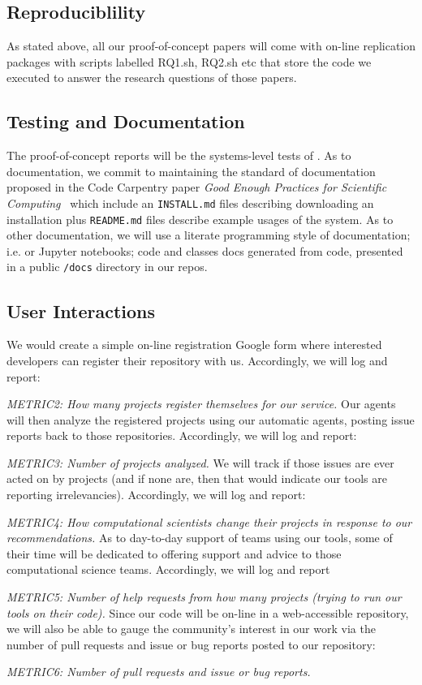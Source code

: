 \subsection{Reproduciblility }
 As stated above,
all our proof-of-concept papers will come with on-line replication packages
with scripts labelled RQ1.sh, RQ2.sh etc that store the code we executed to answer the research questions
of those papers. 


\subsection{Testing and Documentation}
The proof-of-concept reports will be the
systems-level tests of {\IT}.
As to documentation, we   commit to  maintaining  the standard of documentation proposed
in the Code Carpentry  paper {\em Good Enough Practices for Scientific Computing}~\cite{Wilson16} which include an {\tt INSTALL.md} files describing downloading
an installation plus {\tt README.md} files describe example usages of the system.
As to other documentation, we will use a literate  programming style of documentation; i.e.
or Jupyter notebooks;  
 code and classes docs generated  from  code,
presented in a public  {\tt /docs} directory in
our repos.



\subsection{User Interactions} We would create a simple on-line registration Google
form  where interested developers can register their repository with us. Accordingly, we will log and report: 
\bi
\item {\em METRIC2: How many projects register themselves for our service.}
\ei
Our agents will then analyze the 
registered projects using our automatic agents,
posting   issue reports back to those repositories.
Accordingly, we will log and report: 
\bi
\item {\em METRIC3: Number of projects analyzed.}
\ei
We will  track if those issues
are ever acted on by  projects (and if none are, then that would indicate our tools are reporting
irrelevancies). Accordingly, we will log and report: 
\bi
\item {\em METRIC4: How computational scientists change their projects
in response to our recommendations.}
\ei
As to day-to-day support of teams using our tools,
some of  their time will be dedicated
to offering   support and advice to  those computational science teams.
Accordingly, we will log and report
\bi
\item {\em METRIC5: Number of help requests from how many projects (trying to run our tools on their code).}
\ei
Since our code will be on-line in a web-accessible repository, we will also be able
to gauge the community's interest in our work via the number of pull requests and issue
or
bug reports posted to our repository:
\bi
\item {\em METRIC6: Number of pull requests and issue or bug reports.}
\ei
